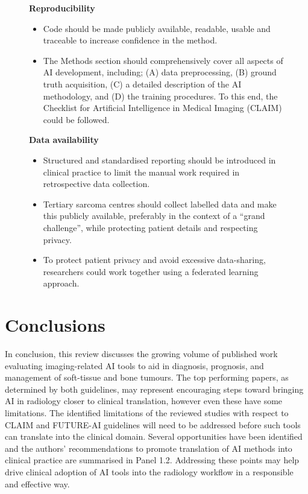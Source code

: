 \begin{figure}[htbp]
\begin{framed}
	\noindent\textbf{Reproducibility}
	\begin{itemize}
		\item Code should be made publicly available, readable, usable and traceable to increase confidence in the method.
		\item The Methods section should comprehensively cover all aspects of AI development, including; (A) data preprocessing, (B) ground truth acquisition, (C) a detailed description of the AI methodology, and (D) the training procedures. To this end, the Checklist for Artificial Intelligence in Medical Imaging (CLAIM) could be followed.
	\end{itemize}

	\noindent\textbf{Data availability}
	\begin{itemize}
		\item Structured and standardised reporting should be introduced in clinical practice to limit the manual work required in retrospective data collection.
		\item Tertiary sarcoma centres should collect labelled data and make this publicly available, preferably in the context of a ``grand challenge'', while protecting patient details and respecting privacy.
		\item To protect patient privacy and avoid excessive data-sharing, researchers could work together using a federated learning approach.
	\end{itemize}
\end{framed}
\end{figure}

\section{Conclusions}
In conclusion, this review discusses the growing volume of published work evaluating imaging-related AI tools to aid in diagnosis, prognosis, and management of soft-tissue and bone tumours.
The top performing papers, as determined by both guidelines, may represent encouraging steps toward bringing AI in radiology closer to clinical translation, however even these have some limitations.
The identified limitations of the reviewed studies with respect to CLAIM and FUTURE-AI guidelines will need to be addressed before such tools can translate into the clinical domain.
Several opportunities have been identified and the authors' recommendations to promote translation of AI methods into clinical practice are summarised in Panel 1.2.
Addressing these points may help drive clinical adoption of AI tools into the radiology workflow in a responsible and effective way.

